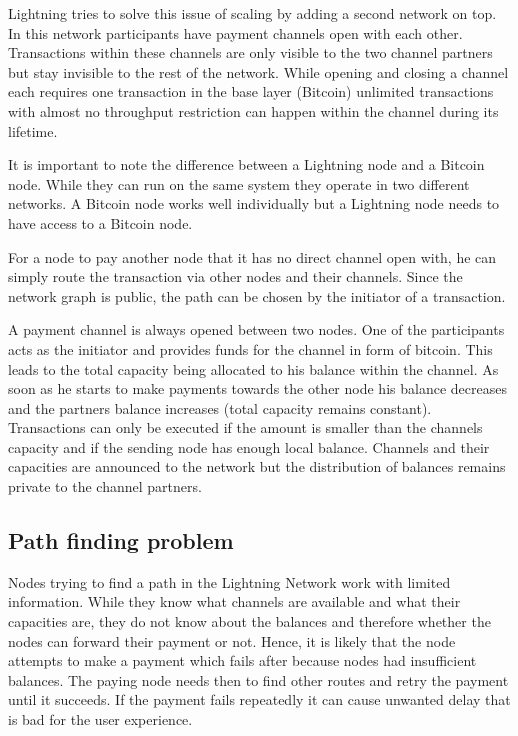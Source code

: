 \documentclass[final]{fhnwreport}       %
\begin{document}
Lightning tries to solve this issue of scaling by adding a second network on top. In this network participants have payment channels open with each other. Transactions within these channels are only visible to the two channel partners but stay invisible to the rest of the network. While opening and closing a channel each requires one transaction in the base layer (Bitcoin) unlimited transactions with almost no throughput restriction can happen within the channel during its lifetime. 

It is important to note the difference between a Lightning node and a Bitcoin node. While they can run on the same system they operate in two different networks. A Bitcoin node works well individually but a Lightning node needs to have access to a Bitcoin node.

For a node to pay another node that it has no direct channel open with, he can simply route the transaction via other nodes and their channels. Since the network graph is public, the path can be chosen by the initiator of a transaction. 

A payment channel is always opened between two nodes. One of the participants acts as the initiator and provides funds for the channel in form of bitcoin. This leads to the total capacity being allocated to his balance within the channel. As soon as he starts to make payments towards the other node his balance decreases and the partners balance increases (total capacity remains constant). Transactions can only be executed if the amount is smaller than the channels capacity and if the sending node has enough local balance. Channels and their capacities are announced to the network but the distribution of balances remains private to the channel partners.


\subsection{Path finding problem}
Nodes trying to find a path in the Lightning Network work with limited information. While they know what channels are available and what their capacities are, they do not know about the balances and therefore whether the nodes can forward their payment or not. Hence, it is likely that the node attempts to make a payment which fails after because nodes had insufficient balances. The paying node needs then to find other routes and retry the payment until it succeeds. If the payment fails repeatedly it can cause unwanted delay that is bad for the user experience. 
\end{document}
